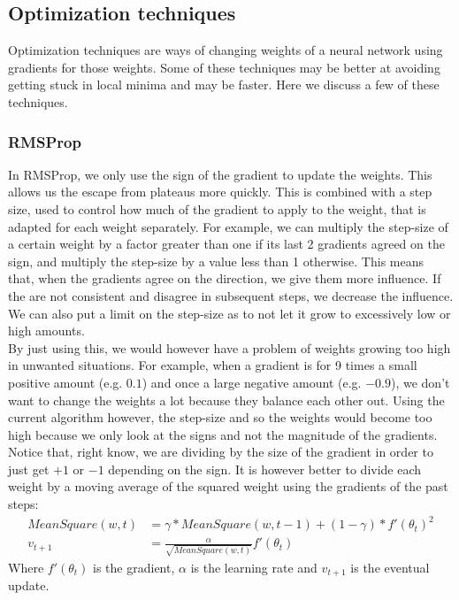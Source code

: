 \documentclass[a4paper]{article}
\begin{document}
\subsection{Optimization techniques}
Optimization techniques are ways of changing weights of a neural network using gradients for those weights. Some of these techniques may be better at avoiding getting stuck in local minima and may be faster. Here we discuss a few of these techniques.
\subsubsection{RMSProp}

In RMSProp, we only use the sign of the gradient to update the weights. This allows us the escape from plateaus more quickly. This is combined with a step size, used to control how much of the gradient to apply to the weight, that is adapted for each weight separately. For example, we can multiply the step-size of a certain weight by a factor greater than one if its last 2 gradients agreed on the sign, and multiply the step-size by a value less than 1 otherwise. This means that, when the gradients agree on the direction, we give them more influence. If the are not consistent and disagree in subsequent steps, we decrease the influence. We can also put a limit on the step-size as to not let it grow to excessively low or high amounts.\\
By just using this, we would however have a problem of weights growing too high in unwanted situations. For example, when a gradient is for 9 times a small positive amount (e.g. $0.1$) and once a large negative amount (e.g. $-0.9$), we don't want to change the weights a lot because they balance each other out. Using the current algorithm however, the step-size and so the weights would become too high because we only look at the signs and not the magnitude of the gradients.\\
Notice that, right know, we are dividing by the size of the gradient in order to just get $+1$ or $-1$ depending on the sign. It is however better to divide each weight by a moving average of the squared weight using the gradients of the past steps:
\begin{align}
MeanSquare(w, t) &= \gamma * MeanSquare(w, t-1) + (1 - \gamma) * f'(\theta_t)^2 \\
v_{t+1} &= \frac{\alpha}{\sqrt{MeanSquare(w,t)}}f'(\theta_t)
\end{align}
Where $f'(\theta_t)$ is the gradient, $\alpha$ is the learning rate and $v_{t+1}$ is the eventual update.
\end{document}
